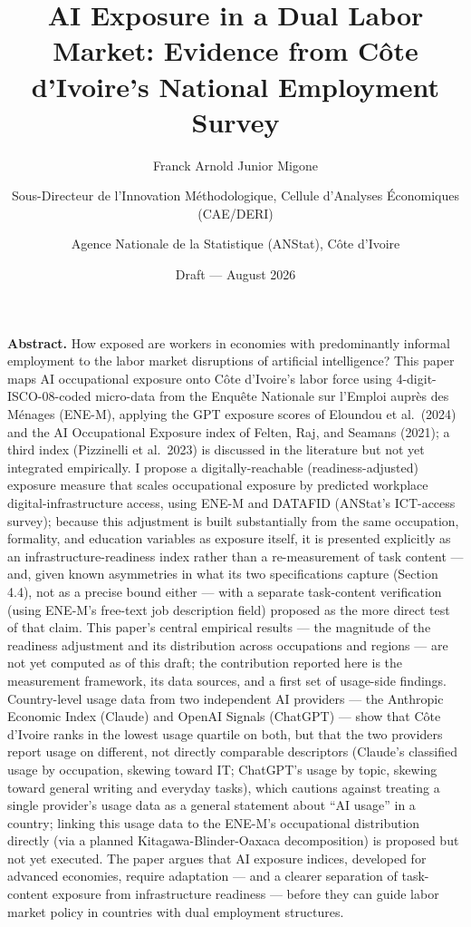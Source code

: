 \documentclass[
  11pt,
]{article}
\title{AI Exposure in a Dual Labor Market: Evidence from Côte d'Ivoire's
National Employment Survey}
\author{Franck Arnold Junior Migone \and Sous-Directeur de l'Innovation
Méthodologique, Cellule d'Analyses Économiques (CAE/DERI) \and Agence
Nationale de la Statistique (ANStat), Côte d'Ivoire}
\date{Draft --- August 2026}
\begin{document}
\maketitle

\textbf{Abstract.} How exposed are workers in economies with
predominantly informal employment to the labor market disruptions of
artificial intelligence? This paper maps AI occupational exposure onto
Côte d'Ivoire's labor force using 4-digit-ISCO-08-coded micro-data from
the Enquête Nationale sur l'Emploi auprès des Ménages (ENE-M), applying
the GPT exposure scores of Eloundou et al.~(2024) and the AI
Occupational Exposure index of Felten, Raj, and Seamans (2021); a third
index (Pizzinelli et al.~2023) is discussed in the literature but not
yet integrated empirically. I propose a digitally-reachable
(readiness-adjusted) exposure measure that scales occupational exposure
by predicted workplace digital-infrastructure access, using ENE-M and
DATAFID (ANStat's ICT-access survey); because this adjustment is built
substantially from the same occupation, formality, and education
variables as exposure itself, it is presented explicitly as an
infrastructure-readiness index rather than a re-measurement of task
content --- and, given known asymmetries in what its two specifications
capture (Section 4.4), not as a precise bound either --- with a separate
task-content verification (using ENE-M's free-text job description
field) proposed as the more direct test of that claim. This paper's
central empirical results --- the magnitude of the readiness adjustment
and its distribution across occupations and regions --- are not yet
computed as of this draft; the contribution reported here is the
measurement framework, its data sources, and a first set of usage-side
findings. Country-level usage data from two independent AI providers ---
the Anthropic Economic Index (Claude) and OpenAI Signals (ChatGPT) ---
show that Côte d'Ivoire ranks in the lowest usage quartile on both, but
that the two providers report usage on different, not directly
comparable descriptors (Claude's classified usage by occupation, skewing
toward IT; ChatGPT's usage by topic, skewing toward general writing and
everyday tasks), which cautions against treating a single provider's
usage data as a general statement about ``AI usage'' in a country;
linking this usage data to the ENE-M's occupational distribution
directly (via a planned Kitagawa-Blinder-Oaxaca decomposition) is
proposed but not yet executed. The paper argues that AI exposure
indices, developed for advanced economies, require adaptation --- and a
clearer separation of task-content exposure from infrastructure
readiness --- before they can guide labor market policy in countries
with dual employment structures.
\end{document}
